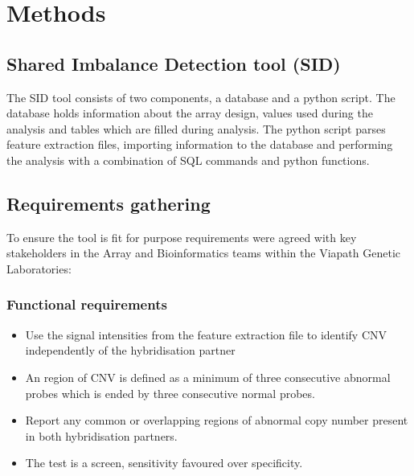 \chapter{Methods}\label{ch:Methods}
\section{Shared Imbalance Detection tool (SID)}
The \ac{SID} tool consists of two components, a database and a python script. The database holds information about the array design, values used during the analysis and tables which are filled during analysis. The python script parses feature extraction files, importing information to the database and performing the analysis with a combination of SQL commands and python functions.

\section{Requirements gathering}
To ensure the tool is fit for purpose requirements were agreed with key stakeholders in the Array and Bioinformatics teams within the Viapath Genetic Laboratories:
\subsection{Functional requirements}
\begin{itemize}
\item Use the signal intensities from the feature extraction file to identify \ac{CNV} independently of the hybridisation partner
\item An region of \ac{CNV} is defined as a minimum of three consecutive abnormal probes which is ended by three consecutive normal probes.
\item Report any common or overlapping regions of abnormal copy number present in both hybridisation partners.
\item The test is a screen, sensitivity favoured over specificity.
\end{itemize}
